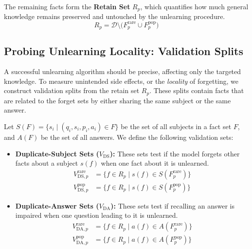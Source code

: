 The remaining facts form the \textbf{Retain Set} \(R_p\), which quantifies how much general knowledge remains preserved and untouched by the unlearning procedure.
\begin{equation}
  R_p = \mathcal{D} \setminus \bigl(F_p^{\text{rare}} \cup F_p^{\text{pop}}\bigr)
  \label{eq:retain-construction}
\end{equation}


\subsection{Probing Unlearning Locality: Validation Splits}
\label{subsec:duplicates_splits}

A successful unlearning algorithm should be precise, affecting only the targeted knowledge. To measure unintended side effects, or the \emph{locality} of forgetting, we construct validation splits from the retain set $R_p$. These splits contain facts that are related to the forget sets by either sharing the same subject or the same answer.

Let $S(F) = \{s_i \mid (q_i, s_i, p_i, a_i) \in F\}$ be the set of all subjects in a fact set $F$, and $A(F)$ be the set of all answers. We define the following validation sets:
\begin{itemize}
    \item \textbf{Duplicate-Subject Sets ($V_{\text{DS}}$):} These sets test if the model forgets other facts about a subject $s(f)$ when one fact about it is unlearned.
    \begin{align}
      V_{\text{DS}, p}^{\text{rare}} &= \{ f \in R_p \mid s(f) \in S(F_p^{\text{rare}}) \} \label{eq:vds-rare} \\
      V_{\text{DS}, p}^{\text{pop}}  &= \{ f \in R_p \mid s(f) \in S(F_p^{\text{pop}}) \} \label{eq:vds-pop}
    \end{align}
    
    \item \textbf{Duplicate-Answer Sets ($V_{\text{DA}}$):} These sets test if recalling an answer is impaired when one question leading to it is unlearned.
    \begin{align}
      V_{\text{DA}, p}^{\text{rare}} &= \{ f \in R_p \mid a(f) \in A(F_p^{\text{rare}}) \} \label{eq:vda-rare} \\
      V_{\text{DA}, p}^{\text{pop}}  &= \{ f \in R_p \mid a(f) \in A(F_p^{\text{pop}}) \} \label{eq:vda-pop}
    \end{align}
\end{itemize}

